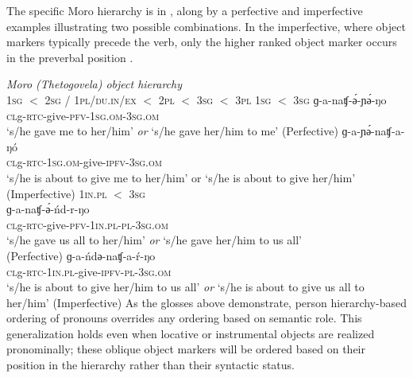 
The specific Moro hierarchy is in , along by a perfective and imperfective examples illustrating two possible combinations. In the imperfective, where object markers typically precede the verb, only the higher ranked object marker occurs in the preverbal position \citep{Jenks:2015}. 


\ea \textit{Moro (Thetogovela) object hierarchy} \label{ex:ch12:hier}\\
\textsc{1sg} $<$ \textsc{2sg} / \textsc{1pl/du.in/ex} $<$ \textsc{2pl} $<$ \textsc{3sg}  $<$ \textsc{3pl}
\ex \textsc{1sg} $<$ \textsc{3sg}
\ea \gll ɡ-a-naʧ-ә́-ɲә́-ŋo \\
\textsc{cl}g-\textsc{rtc}-give-\textsc{pfv}-\textsc{1sg.om}-\textsc{3sg.om} \\
\glt `s/he gave me to her/him' \textit{or} `s/he gave her/him to me' (Perfective)
\ex  \gll ɡ-a-ɲә́-naʧ-a-ŋó \\
\textsc{cl}g-\textsc{rtc}-\textsc{1sg.om}-give-\textsc{ipfv}-\textsc{3sg.om} \\
\glt `s/he is about to give me to her/him' or `s/he is about to give her/him' (Imperfective)
\z 
\ex \textsc{1in.pl} $<$ \textsc{3sg}\\
\ea \gll ɡ-a-naʧ-ә́-ńd-r-ŋo \\
\textsc{cl}g-\textsc{rtc}-give-\textsc{pfv}-\textsc{1in.pl-pl}-\textsc{3sg.om} \\
\glt `s/he gave us all to her/him' \textit{or} `s/he gave her/him to us all'\\ (Perfective)
\ex \gll ɡ-a-ńdә-naʧ-a-ŕ-ŋo\\
\textsc{cl}g-\textsc{rtc}-\textsc{1in.pl}-give-\textsc{ipfv}-\textsc{pl}-\textsc{3sg.om} \\
\glt  `s/he is about to give her/him to us all' \textit{or} `s/he is about to give us all to her/him' (Imperfective)
\z 
\z 
As the glosses above demonstrate, person hierarchy-based ordering of pronouns overrides any ordering based on semantic role. This generalization holds even when locative or instrumental objects are realized pronominally; these oblique object markers will be ordered based on their position in the hierarchy rather than their syntactic status. 


